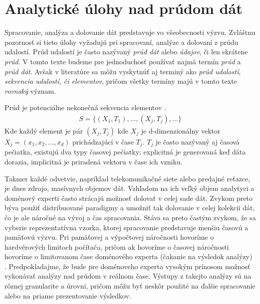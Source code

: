 \chapter{Analytické úlohy nad prúdom dát}
\label{Analytické úlohy v prúde dát}
Spracovanie, analýza a dolovanie dát predstavuje vo všeobecnosti výzvu. Zvláštnu pozornosť si tieto úlohy vyžadujú pri spracovaní, analýze a dolovaní z prúdu udalostí. Prúd udalostí je často nazývaný \textit{prúd dát} alebo \textit{údajov}, či len skrátene \textit{prúd}. V tomto texte budeme pre jednoduchosť používať najmä termín \textit{prúd} a \textit{prúd dát}. Avšak v literatúre sa môžu vyskytnúť aj terminý ako \textit{prúd udalostí}, \textit{sekvencia udalostí, či elementov}, pričom všetky termíny majú v tomto texte \textit{rovnaký} význam. 
\par
\begin{definition}{Prúd je potenciálne nekonečná sekvencia elementov \citep{tran2014change}.}
\begin{align*}
	S = \{(X_1,T_1), ..., (X_j,T_j), ...\}
\end{align*}
Kde každý element je pár $(X_j,T_j)$ kde $X_j$ je d-dimenzionálny vektor $X_j = (x_1, x_2, ..., x_d)$ prichádzajúci v čase $T_j$. $T_j$ je často nazývaný aj časová pečiatka, existujú dva typy časovej pečiatky: explicitná je generovaná keď dáta dorazia, implicitná je priradená vektoru v čase ich vzniku.
\end{definition}

Takmer každé odvetvie, napríklad telekomunikačné siete alebo predajné reťazce, je dnes zdrojo, masívnych objemov dát. Vzhľadom na ich veľký objem analytyci a doménový experti často strácajú možnosť dolovať v celej sade dát. Zvykom preto býva použiť distribuované paradigmy a umožniť tak dolovanie v celej kolekcii dát, čo je ale náročné na vývoj a čas spracovania. Stáva sa preto častým zvykom, že sa vyberie reprezentatívna vzorka, ktorej spracovanie predstavuje menšiu časovú a pamäťovú výzvu. Pri pamäťovej a výpočtovej náročnosti hovoríme o hardvérových limitoch počítača, pričom ak hovoríme o časovej náročnosti hovoríme o limitovanom čase doménového experta (čakanie na výsledok analýzy) \citep{hulten2001mining}. Predpokladajme, že bude pre doménoveho experta vysokým prínosom možnosť vykonávať analýzy nad prúdom v reálnom čase. Výstupy z takejto analýzy sú na rôznej granularite a úrovni, pričom môžu byť neskôr použité na ďalšie spracovanie alebo na priame prezentovanie výsledkov. \par

